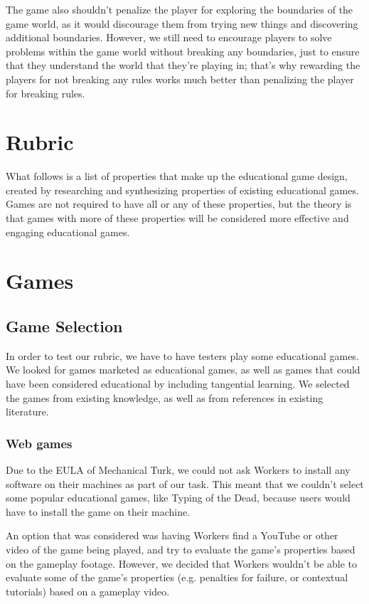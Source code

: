 \documentclass[12pt]{report}
\begin{document}
		The game also shouldn't penalize the player for exploring the boundaries of the game world, as it would discourage them from trying new things and discovering additional boundaries. However, we still need to encourage players to solve problems within the game world without breaking any boundaries, just to ensure that they understand the world that they're playing in; that's why rewarding the players for not breaking any rules works much better than penalizing the player for breaking rules.

\chapter{Rubric}
	What follows is a list of properties that make up the educational game design, created by researching and synthesizing properties of existing educational games. Games are not required to have all or any of these properties, but the theory is that games with more of these properties will be considered more effective and engaging educational games.



\chapter{Games}
	\section{Game Selection}
		In order to test our rubric, we have to have testers play some educational games. We looked for games marketed as educational games, as well as games that could have been considered educational by including tangential learning. We selected the games from existing knowledge, as well as from references in existing literature.

		\subsection{Web games}
			Due to the EULA of Mechanical Turk, we could not ask Workers to install any software on their machines as part of our task. This meant that we couldn't select some popular educational games, like Typing of the Dead, because users would have to install the game on their machine.

			An option that was considered was having Workers find a YouTube or other video of the game being played, and try to evaluate the game's properties based on the gameplay footage. However, we decided that Workers wouldn't be able to evaluate some of the game's properties (e.g. penalties for failure, or contextual tutorials) based on a gameplay video. 
\end{document}
